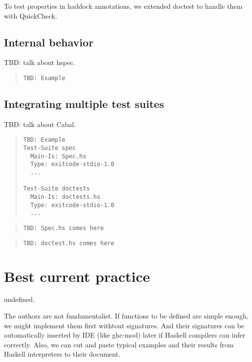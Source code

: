 \documentclass[preprint]{sigplanconf}
\begin{document}
\noindent To test properties in haddock annotations, we extended doctest to handle
them with QuickCheck.

\subsection{Internal behavior}

TBD: talk about hspec.

\begin{quote}
\begin{verbatim}
TBD: Example
\end{verbatim}
\end{quote}

\subsection{Integrating multiple test suites}

TBD: talk about Cabal.

\begin{quote}
\begin{verbatim}
TBD: Example
Test-Suite spec
  Main-Is: Spec.hs
  Type: exitcode-stdio-1.0
  ...

Test-Suite doctests
  Main-Is: doctests.hs
  Type: exitcode-stdio-1.0
  ...
\end{verbatim}
\end{quote}

\begin{quote}
\begin{verbatim}
TBD: Spec.hs comes here
\end{verbatim}
\end{quote}

\begin{quote}
\begin{verbatim}
TBD: doctest.hs comes here
\end{verbatim}
\end{quote}


\section{Best current practice}

undefined.

The authors are not fundamentalist.
If functions to be defined are simple enough,
we might implement them first withtout signatures.
And their signatures can be automatically
inserted by IDE (like ghc-mod) later
if Haskell compilers can infer correctly.
Also, we can cut and paste typical examples and their results
from Haskell interpreters to their document.
\end{document}
